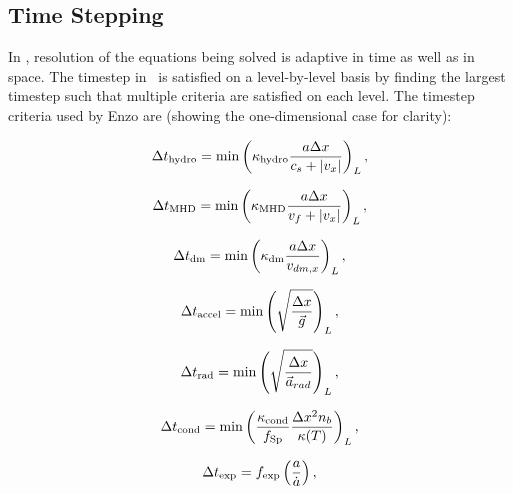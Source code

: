 \subsection{Time Stepping}
\label{sec.timestepping}

In \enzo, resolution of the equations being solved is adaptive in time 
as well as in space.  The timestep in \enzo\ is satisfied on a level-by-level
 basis by finding the largest timestep such that multiple criteria are
satisfied on each level.  The timestep criteria used by Enzo are 
(showing the one-dimensional case for clarity):

\begin{equation}
\Delta t_{\rm hydro} = \min \left( \kappa_{\rm hydro} \frac{a \Delta x}{c_{s} + |v_x|} \right)_L ,
\label{eqn:dthydro}
\end{equation}

\begin{equation}
\Delta t_{\rm MHD} = \min \left( \kappa_{\rm MHD} \frac{a \Delta x}{v_{f} + |v_x|} \right)_L ,
\label{eqn:dtMHD}
\end{equation}

\begin{equation}
\Delta t_{\rm dm} = \min \left(\kappa_{\rm dm} \frac{a \Delta x}{v_{dm,x}} \right)_L ,
\label{eqn:dtdarkmatter}
\end{equation}

\begin{equation}
\Delta t_{\rm accel} = \min \left( \sqrt{\frac{\Delta x}{\vec{g}}} \right)_L ,
\label{eqn:dtaccel}
\end{equation}

\begin{equation}
\Delta t_{\rm rad} = \min \left(  \sqrt{\frac{\Delta x}{\vec{a}_{rad}}} \right)_L,
\label{eqn:dtrad}
\end{equation}

\begin{equation}
\Delta t_{\rm cond} = \min \left(  \frac{ \kappa_{\rm cond}}{f_{\rm Sp}} \frac{\Delta x^2
    n_b}{\kappa(T)} \right)_L,
\label{eqn:dtcond}
\end{equation}

\begin{equation}
\Delta t_{\rm exp} = f_{\rm exp} \left( \frac{a}{\dot{a}} \right) ,
\label{eqn:dtexpand}
\end{equation}


